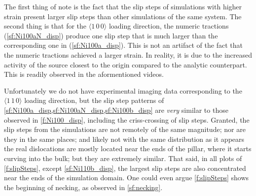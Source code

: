 The first thing of note is the fact that the slip steps of simulations with higher strain present larger slip steps than other simulations of the same system. The second thing is that for the $\langle 1\, 0\, 0 \rangle$ loading direction, the numeric tractions (\cref{sf:Ni100aN_disp}) produce one slip step that is much larger than the corresponding one in (\cref{sf:Ni100a_disp}). This is not an artifact of the fact that the numeric tractions achieved a larger strain. In reality, it is due to the increased activity of the source closest to the origin compared to the analytic counterpart. This is readily observed in the aformentioned videos.

Unfortunately we do not have experimental imaging data corresponding to the $\langle 1\, 1\, 0 \rangle$ loading direction, but the slip step patterns of \cref{sf:Ni100a_disp,sf:Ni100aN_disp,sf:Ni100b_disp} are \emph{very} similar to those observed in \cref{f:Ni100_disp}, including the criss-crossing of slip steps. Granted, the slip steps from the simulations are not remotely of the same magnitude; nor are they in the same places; and likely not with the same distribution as it appears the real dislocations are mostly located near the ends of the pillar, where it starts curving into the bulk; but they are extremely similar. That said, in all plots of \cref{f:slipSteps}, except \cref{sf:Ni110b_disp}, the largest slip steps are also concentrated near the ends of the simulation domain. One could even argue \cref{f:slipSteps} shows the beginning of necking, as observed in \cref{sf:necking}.
